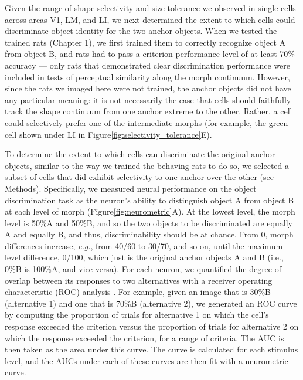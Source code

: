 Given the range of shape selectivity and size tolerance we observed in single cells across areas V1, LM, and LI, we next determined the extent to which cells could discriminate object identity for the two anchor objects. When we tested the trained rats (Chapter 1), we first trained them to correctly recognize object A from object B, and rats had to pass a criterion performance level of at least 70\% accuracy --- only rats that demonstrated clear discrimination performance were included in tests of perceptual similarity along the morph continuum. However, since the rats we imaged here were not trained, the anchor objects did not have any particular meaning: it is not necessarily the case that cells should faithfully track the shape continuum from one anchor extreme to the other. Rather, a cell could selectively prefer one of the intermediate morphs (for example, the green cell shown under LI in Figure\ref{fig:selectivity_tolerance}E). 

To determine the extent to which cells can discriminate the original anchor objects, similar to the way we trained the behaving rats to do so, we selected a subset of cells that did exhibit selectivity to one anchor over the other (see Methods). Specifically, we measured neural performance on the object discrimination task as the neuron's ability to distinguish object A from object B at each level of morph (Figure\ref{fig:neurometric}A). At the lowest level, the morph level is 50\%A and 50\%B, and so the two objects to be discriminated are equally A and equally B, and thus, discriminability should be at chance. From 0, morph differences increase, \textit{e.g.}, from 40/60 to 30/70, and so on, until the maximum level difference, 0/100, which just is the original anchor objects A and B (i.e., 0\%B is 100\%A, and vice versa). For each neuron, we quantified the degree of overlap between its responses to two alternatives with a receiver operating characteristic (ROC) analysis \cite{Britten1992, Rust2010SelectivityIT}. For example, given an image that is 30\%B (alternative 1) and one that is 70\%B (alternative 2), we generated an ROC curve by computing the proportion of trials for alternative 1 on which the cell's response exceeded the criterion versus the proportion of trials for alternative 2 on which the response exceeded the criterion, for a range of criteria. The AUC is then taken as the area under this curve. The curve is calculated for each stimulus level, and the AUCs under each of these curves are then fit with a neurometric curve. 

